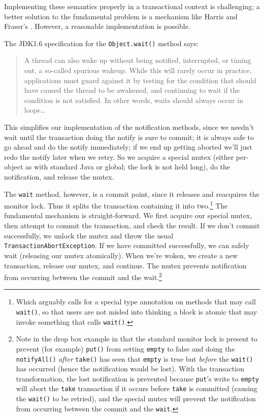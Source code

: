 Implementing these semantics properly in a transactional context is
challenging; a better solution to the fundamental problem is a
mechanism like Harris and Fraser's 
\cite{HarrisFr03}.  However, a reasonable implementation is possible.

The JDK1.6 specification for the \texttt{Object.wait()} method says:
\begin{quote}
A thread can also wake up without being notified, interrupted, or
timing out, a so-called spurious wakeup. While this will rarely occur
in practice, applications must guard against it by testing for the
condition that should have caused the thread to be awakened, and
continuing to wait if the condition is not satisfied. In other words,
waits should always occur in loops\ldots
\end{quote}
This simplifies our implementation of the notification methods, since
we needn't wait until the transaction doing the notify is sure to
commit; it is always safe to go ahead and do the notify immediately;
if we end up getting aborted we'll just redo the notify later when we
retry.  So we acquire a special mutex (either per-object as with
standard Java or global; the lock is not held long), do the
notification, and release the mutex.

The \texttt{wait} method, however, is a commit point, since it
releases and reacquires the monitor lock.  Thus it splits the
transaction containing it into two.\footnote{Which arguably calls for
a special type annotation on methods that may call \texttt{wait()},
so that users are not misled into thinking a block is atomic that may
invoke something that calls \texttt{wait()}.}  The fundamental
mechanism is straight-forward.  We first acquire our special mutex,
then attempt to commit the transaction, and check the result.  If we
don't commit successfully, we unlock the mutex and throw the usual
\texttt{TransactionAbortException}.  If we have committed
successfully, we can safely wait (releasing our mutex atomically).
When we're woken, we create a new transaction, release our mutex, and
continue.  The mutex prevents notification from occurring between the
commit and the wait.\footnote{Note in the drop box example in
 that the standard monitor lock is present to prevent
(for example) \texttt{put()} from setting \texttt{empty} to false and
doing the \texttt{notifyAll()} \textit{after} \texttt{take()} has seen
that \texttt{empty} is true but \textit{before} the \texttt{wait()}
has occurred (hence the notification would be lost).  With the
transaction transformation, the lost notification is prevented because
\texttt{put}'s write to \texttt{empty} will abort the \texttt{take}
transaction if it occurs before \texttt{take} is committed (causing
the \texttt{wait()} to be retried), and the special mutex will prevent
the notification from occurring between the commit and the
\texttt{wait}.}

